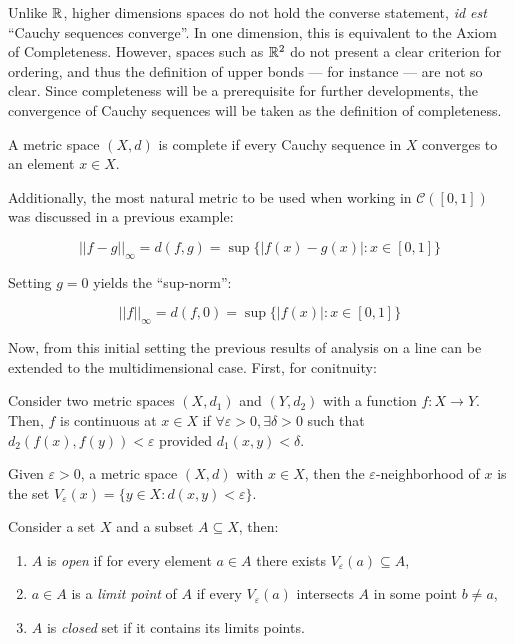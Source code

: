 Unlike $\mathbb{R}$, higher dimensions spaces do not hold the converse statement, \textit{id est} ``Cauchy sequences converge''. In one dimension, this is equivalent to the Axiom of Completeness. However, spaces such as $\mathbb{R}^2$ do not present a clear criterion for ordering, and thus the definition of upper bonds — for instance — are not so clear. Since completeness will be a prerequisite for further developments, the convergence of Cauchy sequences will be taken as the definition of completeness.

\begin{definition}[Completeness]
    A metric space $(X, d)$ is complete if every Cauchy sequence in $X$ converges to an element $x \in X$.
\end{definition}

Additionally, the most natural metric to be used when working in $\mathcal{C}([0,1])$ was discussed in a previous example:

\begin{equation*}
    ||f - g||_\infty  = d(f,g) = \sup \{ |f(x) - g(x)|:x \in [0,1] \}
\end{equation*}

Setting $g = 0$ yields the ``sup-norm'':

\begin{equation*}
    ||f||_\infty = d(f, 0) = \sup \{ |f(x)|:x \in [0,1] \} 
\end{equation*}

Now, from this initial setting the previous results of analysis on a line can be extended to the multidimensional case. First, for conitnuity:

\begin{definition}
    Consider two metric spaces $(X, d_1)$ and $(Y, d_2)$ with a function $f: X \to Y$. Then, $f$ is continuous at $x \in X$ if $\forall \varepsilon > 0, \exists \delta > 0$ such that $d_2(f(x), f(y)) < \varepsilon$ provided $d_1(x, y) < \delta$.
\end{definition}

\begin{definition}
    Given $\varepsilon > 0$, a metric space $(X,d)$ with $x \in X$, then the $\varepsilon$-neighborhood of $x$ is the set $V_\varepsilon (x) = \{ y \in X : d(x, y) < \varepsilon\}$.
\end{definition}

\begin{definition}
    Consider a set $X$ and a subset $A \subseteq X$, then:
    \begin{enumerate}
        \item $A$ is \emph{open} if for every element $a \in A$ there exists $V_\varepsilon(a) \subseteq A$,
        \item $a \in A$ is a \emph{limit point} of $A$ if every $V_\varepsilon(a)$ intersects $A$ in some point $b \neq a$,
        \item $A$ is \emph{closed} set if it contains its limits points.
    \end{enumerate}
\end{definition}


